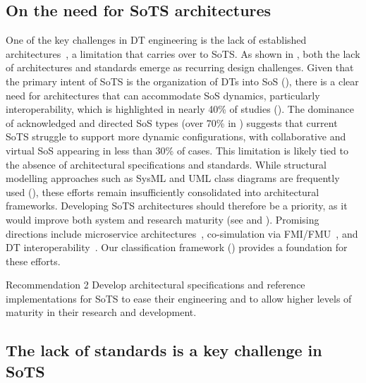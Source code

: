 \subsection{On the need for SoTS architectures}

One of the key challenges in DT engineering is the lack of established architectures~\cite{ferko2022architecting}, a limitation that carries over to SoTS. As shown in , both the lack of architectures and standards emerge as recurring design challenges. Given that the primary intent of SoTS is the organization of DTs into SoS (), there is a clear need for architectures that can accommodate SoS dynamics, particularly interoperability, which is highlighted in nearly 40\% of studies (). The dominance of acknowledged and directed SoS types (over 70\% in ) suggests that current SoTS struggle to support more dynamic configurations, with collaborative and virtual SoS appearing in less than 30\% of cases. This limitation is likely tied to the absence of architectural specifications and standards. While structural modelling approaches such as SysML and UML class diagrams are frequently used (), these efforts remain insufficiently consolidated into architectural frameworks. Developing SoTS architectures should therefore be a priority, as it would improve both system and research maturity (see  and ). Promising directions include microservice architectures~\cite{bellavista2023requirements}, co-simulation via FMI/FMU~\cite{bottjer2023review}, and DT interoperability~\cite{david2024interoperability}. Our classification framework () provides a foundation for these efforts.

\begin{recoframe}{Recommendation 2}
Develop architectural specifications and reference implementations for SoTS to ease their engineering and to allow higher levels of maturity in their research and development.
\end{recoframe}


\subsection{The lack of standards is a key challenge in SoTS}

